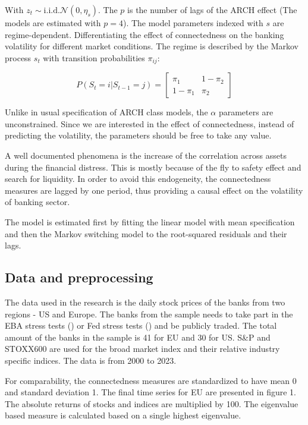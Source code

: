 \documentclass{article}
\begin{document}
With $z_t \sim \text{i.i.d.} \mathcal{N}(0, \eta_s)$. The $p$ is the number of lags of the ARCH effect (The models are estimated with $p = 4$). The model parameters indexed with $s$ are regime-dependent. Differentiating the effect of connectedness on the banking volatility for different market conditions. The regime is described by the Markov process $s_t$ with transition probabilities $\pi_{ij}$:

\begin{equation*}
  P(S_t = i | S_{t-1} = j) = \begin{bmatrix}
    \pi_1 & 1 - \pi_2\\
      1 - \pi_1 & \pi_2
      \end{bmatrix}
\end{equation*}

Unlike in usual specification of ARCH class models, the $\alpha$ parameters are unconstrained. Since we are interested in the effect of connectedness, instead of predicting the volatility, the parameters should be free to take any value.

A well documented phenomena is the increase of the correlation across assets during the financial distress. This is mostly because of the fly to safety effect and search for liquidity. In order to avoid this endogeneity, the connectedness measures are lagged by one period, thus providing a causal effect on the volatility of banking sector.

The model is estimated first by fitting the linear model with mean specification and then the Markov switching model to the root-squared residuals and their lags. 

\subsection*{Data and preprocessing}

The data used in the research is the daily stock prices of the banks from two regions - US and Europe. The banks from the sample needs to take part in the EBA stress tests (\citet{eba}) or Fed stress tests (\citet{fed}) and be publicly traded. The total amount of the banks in the sample is 41 for EU and 30 for US. S\&P and STOXX600 are used for the broad market index and their relative industry specific indices. The data is from 2000 to 2023.

For comparability, the connectedness measures are standardized to have mean 0 and standard deviation 1. The final time series for EU are presented in figure 1. The absolute returns of stocks and indices are multiplied by 100. The eigenvalue based measure is calculated based on a single highest eigenvalue. 
\end{document}
